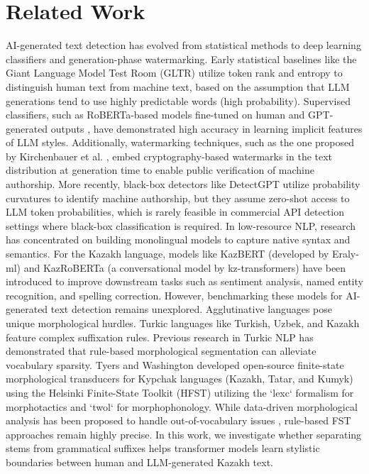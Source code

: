 \documentclass[runningheads]{llncs}
\begin{document}
\section{Related Work}
AI-generated text detection has evolved from statistical methods to deep learning classifiers and generation-phase watermarking. Early statistical baselines like the Giant Language Model Test Room (GLTR) \cite{8} utilize token rank and entropy to distinguish human text from machine text, based on the assumption that LLM generations tend to use highly predictable words (high probability). Supervised classifiers, such as RoBERTa-based models fine-tuned on human and GPT-generated outputs \cite{10}, have demonstrated high accuracy in learning implicit features of LLM styles. Additionally, watermarking techniques, such as the one proposed by Kirchenbauer et al. \cite{9}, embed cryptography-based watermarks in the text distribution at generation time to enable public verification of machine authorship. More recently, black-box detectors like DetectGPT \cite{7} utilize probability curvatures to identify machine authorship, but they assume zero-shot access to LLM token probabilities, which is rarely feasible in commercial API detection settings where black-box classification is required.
In low-resource NLP, research has concentrated on building monolingual models to capture native syntax and semantics. For the Kazakh language, models like KazBERT \cite{4} (developed by Eraly-ml) and KazRoBERTa \cite{5} (a conversational model by kz-transformers) have been introduced to improve downstream tasks such as sentiment analysis, named entity recognition, and spelling correction. However, benchmarking these models for AI-generated text detection remains unexplored.
Agglutinative languages pose unique morphological hurdles. Turkic languages like Turkish, Uzbek, and Kazakh feature complex suffixation rules. Previous research in Turkic NLP has demonstrated that rule-based morphological segmentation can alleviate vocabulary sparsity. Tyers and Washington \cite{6} developed open-source finite-state morphological transducers for Kypchak languages (Kazakh, Tatar, and Kumyk) using the Helsinki Finite-State Toolkit (HFST) utilizing the `lexc` formalism for morphotactics and `twol` for morphophonology. While data-driven morphological analysis has been proposed to handle out-of-vocabulary issues \cite{11}, rule-based FST approaches remain highly precise. In this work, we investigate whether separating stems from grammatical suffixes helps transformer models learn stylistic boundaries between human and LLM-generated Kazakh text.
\end{document}

